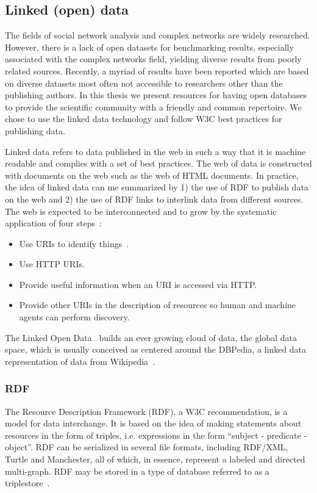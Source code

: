 \subsection{Linked (open) data}
The fields of social network analysis and complex networks
are widely researched.
However, there is a lack of open datasets for benchmarking results,
especially associated with the complex networks field,
yielding diverse results from poorly related sources.
Recently, a myriad of results have been reported which are based on
diverse datasets most often not accessible to researchers other than the publishing authors.
In this thesis we present resources for having open databases to provide 
the scientific community with a friendly and common repertoire.
We chose to use the linked data technology and follow W3C best practices for publishing data.

Linked data refers to data published in the web in such a way that it is
machine readable and complies with a set of best practices.
The web of data is constructed with documents on the web 
such as the web of HTML documents.
In practice, the idea of linked data can me summarized
by 1) the use of RDF to publish data on the web and 2) the use of RDF
links to interlink data from different sources.
The web is expected to be interconnected and to grow by the systematic application of four
steps~\cite{lee1}:
\begin{itemize}
\item Use URIs to identify things~\cite{uri}.
\item Use HTTP URIs.
\item Provide useful information when an URI is accessed via HTTP.
\item Provide other URIs in the description of resources so human
and machine agents can perform discovery.
\end{itemize}

The Linked Open Data~\cite{lod} builds an ever growing cloud of data,
the global data space, which is usually
conceived as centered around the DBPedia, a linked data representation
of data from Wikipedia~\cite{dbpedia0,dbpedia}.

\subsubsection{RDF}
The Resource Description Framework (RDF), a W3C
recommendation, is a model for data
interchange.
It is based on the idea of making statements about resources in the form
of triples, i.e. expressions in the form ``subject - predicate -
object''.
RDF can be serialized in several file formats, including RDF/XML,
Turtle and Manchester, all of which, in essence, represent a labeled and
directed multi-graph.
RDF may be stored in a type of database referred to as a triplestore~\cite{rdf}.

